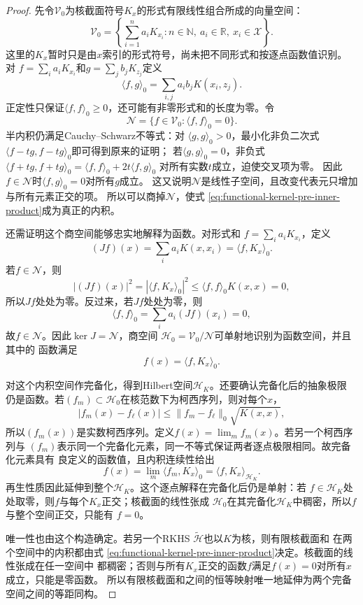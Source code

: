 \begin{proof}
先令$\mathcal{V}_0$为核截面符号$K_x$的形式有限线性组合所成的向量空间：
\[
  \mathcal{V}_0
  =
  \left\{
    \sum_{i=1}^{n}a_iK_{x_i}:
    n\in\mathbb{N},\
    a_i\in\mathbb{R},\
    x_i\in\mathcal{X}
  \right\}.
\]
这里的$K_x$暂时只是由$x$索引的形式符号，尚未把不同形式和按逐点函数值识别。
对
$f=\sum_i a_iK_{x_i}$和$g=\sum_jb_jK_{z_j}$定义
\begin{equation}
  \langle f,g\rangle_0
  =
  \sum_{i,j}a_i b_jK(x_i,z_j).
  \label{eq:functional-kernel-pre-inner-product}
\end{equation}
正定性只保证$\langle f,f\rangle_0\geq0$，还可能有非零形式和的长度为零。令
\[
  \mathcal{N}
  =
  \{f\in\mathcal{V}_0:\langle f,f\rangle_0=0\}.
\]
半内积仍满足Cauchy--Schwarz不等式：对
$\langle g,g\rangle_0>0$，最小化非负二次式
$\langle f-tg,f-tg\rangle_0$即可得到原来的证明；
若$\langle g,g\rangle_0=0$，非负式
$\langle f+tg,f+tg\rangle_0=\langle f,f\rangle_0+2t\langle f,g\rangle_0$
对所有实数$t$成立，迫使交叉项为零。
因此$f\in\mathcal{N}$时$\langle f,g\rangle_0=0$对所有$g$成立。
这又说明$\mathcal N$是线性子空间，且改变代表元只增加与所有元素正交的项。
所以可以商掉$\mathcal{N}$，使式
\eqref{eq:functional-kernel-pre-inner-product}成为真正的内积。

还需证明这个商空间能够忠实地解释为函数。对形式和
$f=\sum_i a_iK_{x_i}$，定义
\[
  (Jf)(x)
  =
  \sum_i a_iK(x,x_i)
  =
  \langle f,K_x\rangle_0.
\]
若$f\in\mathcal{N}$，则
\[
  |(Jf)(x)|^2
  =
  |\langle f,K_x\rangle_0|^2
  \leq
  \langle f,f\rangle_0K(x,x)
  =0,
\]
所以$Jf$处处为零。反过来，若$Jf$处处为零，则
\[
  \langle f,f\rangle_0
  =
  \sum_i a_i(Jf)(x_i)
  =0,
\]
故$f\in\mathcal{N}$。因此$\ker J=\mathcal{N}$，商空间
$\mathcal{H}_0=\mathcal{V}_0/\mathcal{N}$可单射地识别为函数空间，并且其中的
函数满足
\[
  f(x)=\langle f,K_x\rangle_0.
\]

对这个内积空间作完备化，得到Hilbert空间$\mathcal{H}_K$。还要确认完备化后的抽象极限
仍是函数。若$(f_m)\subset\mathcal{H}_0$在核范数下为柯西序列，则对每个$x$，
\[
  |f_m(x)-f_\ell(x)|
  \leq
  \lVert f_m-f_\ell\rVert_0\sqrt{K(x,x)},
\]
所以$(f_m(x))$是实数柯西序列。定义$f(x)=\lim_m f_m(x)$。若另一个柯西序列与
$(f_m)$表示同一个完备化元素，同一不等式保证两者逐点极限相同。故完备化元素具有
良定义的函数值，且内积连续性给出
\[
  f(x)
  =
  \lim_m\langle f_m,K_x\rangle_0
  =
  \langle f,K_x\rangle_{\mathcal{H}_K}.
\]
再生性质因此延伸到整个$\mathcal{H}_K$。这个逐点解释在完备化后仍是单射：若
$f\in\mathcal{H}_K$处处取零，则$f$与每个$K_x$正交；核截面的线性张成
$\mathcal{H}_0$在其完备化$\mathcal{H}_K$中稠密，所以$f$与整个空间正交，只能有
$f=0$。

唯一性也由这个构造确定。若另一个RKHS $\widetilde{\mathcal{H}}$也以$K$为核，则有限核截面和
在两个空间中的内积都由式
\eqref{eq:functional-kernel-pre-inner-product}决定。核截面的线性张成在任一空间中
都稠密；否则与所有$K_x$正交的函数$f$满足$f(x)=0$对所有$x$成立，只能是零函数。
所以有限核截面和之间的恒等映射唯一地延伸为两个完备空间之间的等距同构。
\end{proof}

